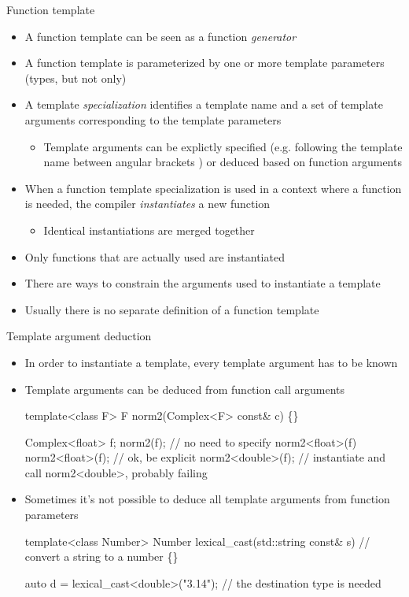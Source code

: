 \begin{frame}{Function template \insertcontinuationtext}
  \begin{itemize}
  \item A function template can be seen as a function \textit{generator}
  \item A function template is parameterized by one or more template parameters
    (types, but not only)
  \item A template \textit{specialization} identifies a template name and a set
    of template arguments corresponding to the template parameters
    \begin{itemize}
    \item Template arguments can be explictly specified (e.g. following the
      template name between angular brackets \code{<>}) or deduced based on
      function arguments
    \end{itemize}
  \item When a function template specialization is used in a context where a
    function is needed, the compiler \textit{instantiates} a new function
    \begin{itemize}
    \item Identical instantiations are merged together
    \end{itemize}
  \item Only functions that are actually used are instantiated
  \item There are ways to constrain the arguments used to instantiate a template
  \item Usually there is no separate definition of a function template
  \end{itemize}
\end{frame}

\begin{frame}[fragile]{Template argument deduction}

  \begin{itemize}
  \item In order to instantiate a template, every template argument has to be
    known
  \item<2-> Template arguments can be deduced from function call arguments
    \begin{codeblock}
template<class F> F norm2(Complex<F> const& c) \{\ddd\}

Complex<float> f;
norm2(f);          // no need to specify norm2<float>(f)
norm2<float>(f);   // ok, be explicit
norm2<double>(f);  // instantiate and call norm2<double>, probably failing\end{codeblock}

  \item<3-> Sometimes it's not possible to deduce all template arguments from function
    parameters
    \begin{codeblock}
template<class Number>
Number lexical_cast(std::string const& s) // convert a string to a number
\{\ddd\}

auto d = lexical_cast<double>("3.14"); // the destination type is needed\end{codeblock}
  \end{itemize}
\end{frame}

